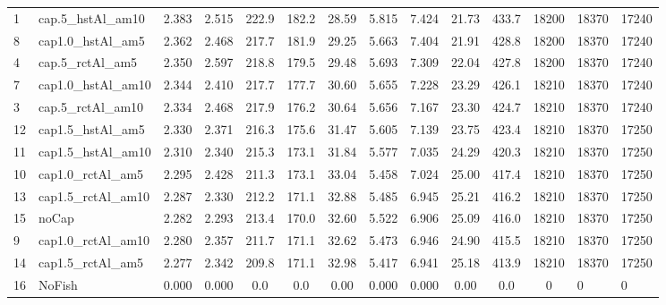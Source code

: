 \documentclass[11pt]{book}
\begin{document}
\begin{landscape}
\begin{longtable}[t]{llccccccccccll}
1 & cap.5\_hstAl\_am10 & 2.383 & 2.515 & 222.9 & 182.2 & 28.59 & 5.815 & 7.424 & 21.73 & 433.7 & 18200 & 18370 & 17240\\
8 & cap1.0\_hstAl\_am5 & 2.362 & 2.468 & 217.7 & 181.9 & 29.25 & 5.663 & 7.404 & 21.91 & 428.8 & 18200 & 18370 & 17240\\
4 & cap.5\_rctAl\_am5 & 2.350 & 2.597 & 218.8 & 179.5 & 29.48 & 5.693 & 7.309 & 22.04 & 427.8 & 18200 & 18370 & 17240\\
7 & cap1.0\_hstAl\_am10 & 2.344 & 2.410 & 217.7 & 177.7 & 30.60 & 5.655 & 7.228 & 23.29 & 426.1 & 18210 & 18370 & 17240\\
3 & cap.5\_rctAl\_am10 & 2.334 & 2.468 & 217.9 & 176.2 & 30.64 & 5.656 & 7.167 & 23.30 & 424.7 & 18210 & 18370 & 17240\\
12 & cap1.5\_hstAl\_am5 & 2.330 & 2.371 & 216.3 & 175.6 & 31.47 & 5.605 & 7.139 & 23.75 & 423.4 & 18210 & 18370 & 17250\\
11 & cap1.5\_hstAl\_am10 & 2.310 & 2.340 & 215.3 & 173.1 & 31.84 & 5.577 & 7.035 & 24.29 & 420.3 & 18210 & 18370 & 17250\\
10 & cap1.0\_rctAl\_am5 & 2.295 & 2.428 & 211.3 & 173.1 & 33.04 & 5.458 & 7.024 & 25.00 & 417.4 & 18210 & 18370 & 17250\\
13 & cap1.5\_rctAl\_am10 & 2.287 & 2.330 & 212.2 & 171.1 & 32.88 & 5.485 & 6.945 & 25.21 & 416.2 & 18210 & 18370 & 17250\\
15 & noCap & 2.282 & 2.293 & 213.4 & 170.0 & 32.60 & 5.522 & 6.906 & 25.09 & 416.0 & 18210 & 18370 & 17250\\
9 & cap1.0\_rctAl\_am10 & 2.280 & 2.357 & 211.7 & 171.1 & 32.62 & 5.473 & 6.946 & 24.90 & 415.5 & 18210 & 18370 & 17250\\
14 & cap1.5\_rctAl\_am5 & 2.277 & 2.342 & 209.8 & 171.1 & 32.98 & 5.417 & 6.941 & 25.18 & 413.9 & 18210 & 18370 & 17250\\
16 & NoFish & 0.000 & 0.000 & 0.0 & 0.0 & 0.00 & 0.000 & 0.000 & 0.00 & 0.0 & 0 & 0 & 0\\*
\end{longtable}
\endgroup{}
\end{landscape}
\endgroup{}

\newpage
\end{document}

